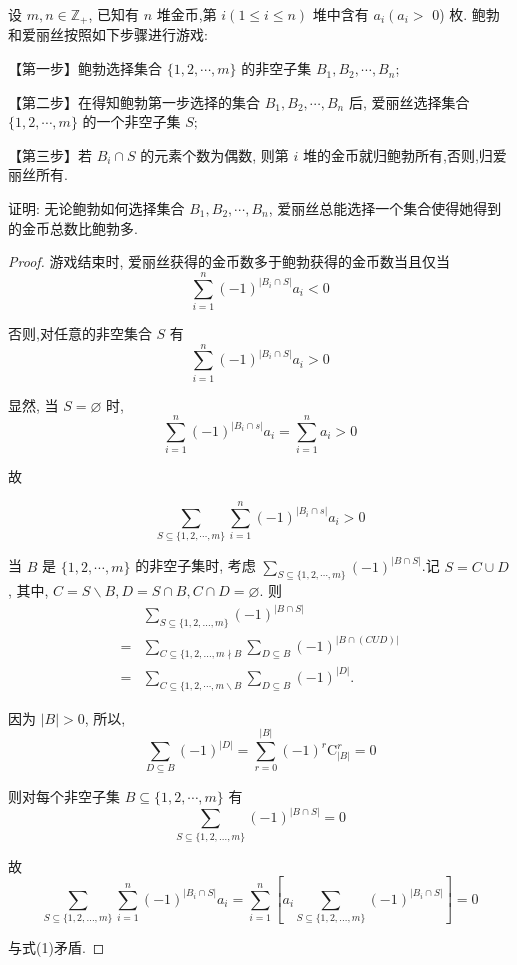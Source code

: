 \begin{example}
	设 $m, n \in \mathbb{Z}_{+}$, 已知有 $n$ 堆金币,第 $i(1 \leqslant i \leqslant n)$ 堆中含有 $a_{i}\left(a_{i}>\right.$ 0) 枚. 鲍勃和爱丽丝按照如下步骤进行游戏:

		【第一步】鲍勃选择集合 $\{1,2, \cdots, m\}$ 的非空子集 $B_{1}, B_{2}, \cdots, B_{n}$;

		【第二步】在得知鲍勃第一步选择的集合 $B_{1}, B_{2}, \cdots, B_{n}$ 后, 爱丽丝选择集合 $\{1,2, \cdots, m\}$ 的一个非空子集 $S ;$

		【第三步】若 $B_{i} \cap S$ 的元素个数为偶数, 则第 $i$ 堆的金币就归鲍勃所有,否则,归爱丽丝所有.

		证明: 无论鲍勃如何选择集合 $B_{1}, B_{2}, \cdots, B_{n}$, 爱丽丝总能选择一个集合使得她得到的金币总数比鲍勃多.
\end{example}

\begin{proof}
	游戏结束时, 爱丽丝获得的金币数多于鲍勃获得的金币数当且仅当
	$$
		\sum_{i=1}^{n}(-1)^{\left|B_{i} \cap S\right|} a_{i}<0
	$$

	否则,对任意的非空集合 $S$ 有
	$$
		\sum_{i=1}^{n}(-1)^{\left|B_{i} \cap S\right|} a_{i}>0
	$$

	显然, 当 $S=\varnothing$ 时,
	$$
		\sum_{i=1}^{n}(-1)^{\left|B_{i} \cap s\right|} a_{i}=\sum_{i=1}^{n} a_{i}>0
	$$

	故


	\begin{equation*}
		\sum_{S \subseteq\{1,2, \cdots, m\}} \sum_{i=1}^{n}(-1)^{\left|B_{i} \cap s\right|} a_{i}>0 \tag{1}
	\end{equation*}


	当 $B$ 是 $\{1,2, \cdots, m\}$ 的非空子集时, 考虑 $\sum_{S \subseteq\{1,2, \cdots, m\}}(-1)^{|B \cap S|}$.记 $S=C \cup D$, 其中, $C=S \backslash B, D=S \cap B, C \cap D=\varnothing$. 则
	$$
		\begin{aligned}
			  & \sum_{S \subseteq\{1,2, \ldots, m\}}(-1)^{|B \cap S|}                                 \\
			= & \sum_{C \subseteq\{1,2, \ldots, m \nmid B} \sum_{D \subseteq B}(-1)^{|B \cap(C U D)|} \\
			= & \sum_{C \subseteq\{1,2, \cdots, m \backslash B} \sum_{D \subseteq B}(-1)^{|D|} .
		\end{aligned}
	$$

	因为 $|B|>0$, 所以,
	$$
		\sum_{D \subseteq B}(-1)^{|D|}=\sum_{r=0}^{|B|}(-1)^{r} \mathrm{C}_{|B|}^{r}=0
	$$

	则对每个非空子集 $B \subseteq\{1,2, \cdots, m\}$ 有
	$$
		\sum_{S \subseteq\{1,2, \ldots, m\}}(-1)^{|B \cap S|}=0
	$$

	故
	$$
		\sum_{S \subseteq\{1,2, \ldots, m\}} \sum_{i=1}^{n}(-1)^{\left|B_{i} \cap S\right|} a_{i}=\sum_{i=1}^{n}\left[a_{i} \sum_{S \subseteq\{1,2, \ldots, m\}}(-1)^{\left|B_{i} \cap S\right|}\right]=0
	$$

	与式(1)矛盾.
\end{proof}


